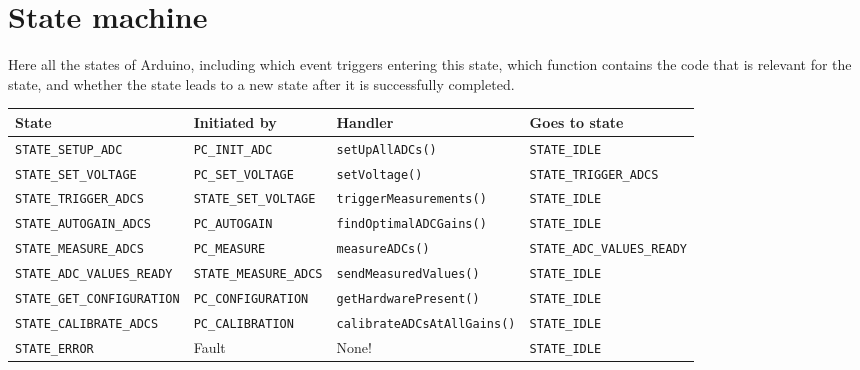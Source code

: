 \documentclass[11pt,a4paper,english]{article}
\begin{document}
\clearpage

\section{State machine}\label{sec:state_machine}
Here all the states of Arduino, including which event triggers entering this state, which function contains the code that is relevant for the state, and whether the state leads to a new state after it is successfully completed.
\begin{center}
\begin{tabular}{llll}\toprule
State					        & Initiated by                 & Handler                           & Goes to state        \\\midrule
\texttt{STATE\_SETUP\_ADC}      & \texttt{PC\_INIT\_ADC}       & \texttt{setUpAllADCs()}           & \texttt{STATE\_IDLE} \\
\texttt{STATE\_SET\_VOLTAGE}    & \texttt{PC\_SET\_VOLTAGE}    & \texttt{setVoltage()}             & \texttt{STATE\_TRIGGER\_ADCS} \\
\texttt{STATE\_TRIGGER\_ADCS}   & \texttt{STATE\_SET\_VOLTAGE} & \texttt{triggerMeasurements()}    & \texttt{STATE\_IDLE} \\
\texttt{STATE\_AUTOGAIN\_ADCS}  & \texttt{PC\_AUTOGAIN}        & \texttt{findOptimalADCGains()}    & \texttt{STATE\_IDLE} \\
\texttt{STATE\_MEASURE\_ADCS}   & \texttt{PC\_MEASURE} 		   & \texttt{measureADCs()}   & \texttt{STATE\_ADC\_VALUES\_READY}\\
\texttt{STATE\_ADC\_VALUES\_READY} & \texttt{STATE\_MEASURE\_ADCS} & \texttt{sendMeasuredValues()} & \texttt{STATE\_IDLE}\\
\texttt{STATE\_GET\_CONFIGURATION} & \texttt{PC\_CONFIGURATION}    & \texttt{getHardwarePresent()} & \texttt{STATE\_IDLE}\\
\texttt{STATE\_CALIBRATE\_ADCS} & \texttt{PC\_CALIBRATION}     & \texttt{calibrateADCsAtAllGains()} & \texttt{STATE\_IDLE}\\
\texttt{STATE\_ERROR}           & Fault                        & None!                             & \texttt{STATE\_IDLE}\\
\bottomrule
\end{tabular}
\end{center}
\end{document}
